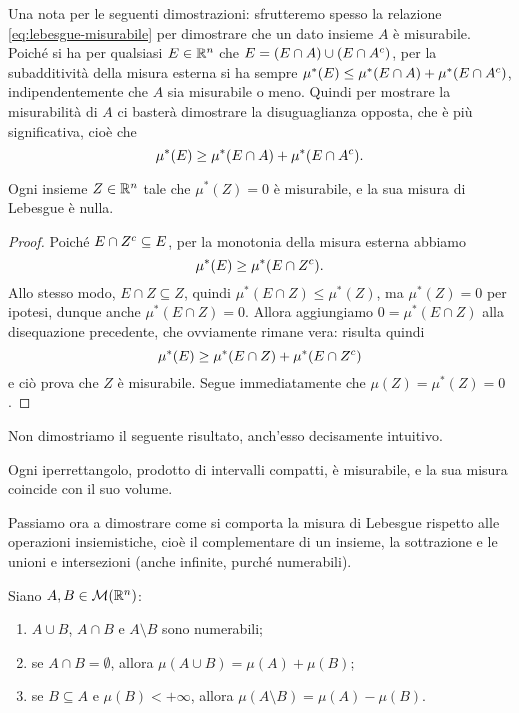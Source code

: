 Una nota per le seguenti dimostrazioni: sfrutteremo spesso la relazione \eqref{eq:lebesgue-misurabile} per dimostrare che un dato insieme $A$ è misurabile.
Poich\'e si ha per qualsiasi $E\in\mathbb{R}^n$ che $E=(E\cap A)\cup(E\cap{A}^c)$, per la subadditività della misura esterna si ha sempre $\mu^*(E)\leq\mu^*(E\cap A)+\mu^*(E\cap{A}^c)$, indipendentemente che $A$ sia misurabile o meno.
Quindi per mostrare la misurabilità di $A$ ci basterà dimostrare la disuguaglianza opposta, che è più significativa, cioè che
\begin{equation}
	\mu^*(E)\geq\mu^*(E\cap A)+\mu^*(E\cap{A}^c).
\end{equation}
\begin{proprieta} \label{pr:misura-nulla}
	Ogni insieme $Z\in\mathbb{R}^n$ tale che $\mu^*(Z)=0$ è misurabile, e la sua misura di Lebesgue è nulla.
\end{proprieta}
\begin{proof}
	Poich\'e $E\cap{Z}^c\subseteq E$, per la monotonia della misura esterna abbiamo
	\begin{equation}
		\mu^*(E)\geq\mu^*(E\cap{Z}^c).
	\end{equation}
	Allo stesso modo, $E\cap Z\subseteq Z$, quindi $\mu^*(E\cap Z)\leq\mu^*(Z)$, ma $\mu^*(Z)=0$ per ipotesi, dunque anche $\mu^*(E\cap Z)=0$.
	Allora aggiungiamo $0=\mu^*(E\cap Z)$ alla disequazione precedente, che ovviamente rimane vera: risulta quindi
	\begin{equation}
		\mu^*(E)\geq\mu^*(E\cap Z)+\mu^*(E\cap{Z}^c)
	\end{equation}
	e ciò prova che $Z$ è misurabile.
	Segue immediatamente che $\mu(Z)=\mu^*(Z)=0$.
\end{proof}
Non dimostriamo il seguente risultato, anch'esso decisamente intuitivo.
\begin{proprieta} \label{pr:misura-iperrettangolo}
	Ogni iperrettangolo, prodotto di intervalli compatti, è misurabile, e la sua misura coincide con il suo volume.
\end{proprieta}
Passiamo ora a dimostrare come si comporta la misura di Lebesgue rispetto alle operazioni insiemistiche, cioè il complementare di un insieme, la sottrazione e le unioni e intersezioni (anche infinite, purch\'e numerabili).
\begin{proprieta} \label{pr:misura-unione-intersezione}
	Siano $A,B\in\mathcal M(\mathbb{R}^n)$:
	\begin{enumerate}
		\item $A\cup B$, $A\cap B$ e $A\setminus B$ sono numerabili;
		\item se $A\cap B=\emptyset$, allora $\mu(A\cup B)=\mu(A)+\mu(B)$;
		\item se $B\subseteq A$ e $\mu(B)<+\infty$, allora $\mu(A\setminus B)=\mu(A)-\mu(B)$.
	\end{enumerate}
\end{proprieta}
